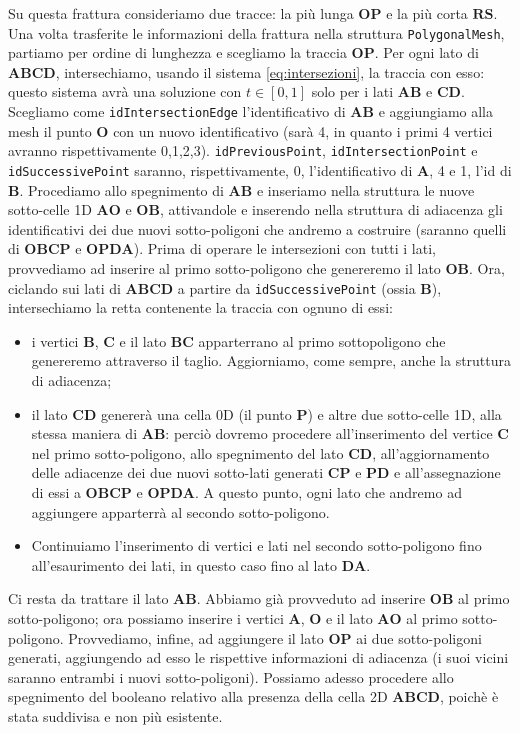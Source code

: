 \documentclass[a4paper]{article}
\newcommand{\B}{\mathbf}
\begin{document}
Su questa frattura consideriamo due tracce: la più lunga $\B{OP}$ e la più corta $\B{RS}$. Una volta trasferite le informazioni della frattura nella struttura \texttt{PolygonalMesh}, partiamo per ordine di lunghezza e scegliamo la traccia $\B{OP}$. Per ogni lato di $\B{ABCD}$, intersechiamo, usando il sistema \eqref{eq:intersezioni}, la traccia con esso: questo sistema avrà una soluzione con $t\in[0,1]$ solo per i lati $\B{AB}$ e $\B{CD}$. Scegliamo come \texttt{idIntersectionEdge} l'identificativo di $\B{AB}$ e aggiungiamo alla mesh il punto $\B O$ con un nuovo identificativo (sarà 4, in quanto i primi 4 vertici avranno rispettivamente 0,1,2,3).
 \texttt{idPreviousPoint}, \texttt{idIntersectionPoint} e \texttt{idSuccessivePoint} saranno, rispettivamente, 0, l'identificativo di $\B A$, 4 e 1, l'id di $\B B$. Procediamo allo spegnimento di $\B{AB}$ e inseriamo nella struttura le nuove sotto-celle 1D $\B{AO}$ e $\B{OB}$, attivandole e inserendo nella struttura di adiacenza gli identificativi dei due nuovi sotto-poligoni che andremo a costruire (saranno quelli di $\B{OBCP}$ e $\B{OPDA}$). Prima di operare le intersezioni con tutti i lati, provvediamo ad inserire al primo sotto-poligono che genereremo il lato $\B{OB}$. Ora, ciclando sui lati di $\B{ABCD}$ a partire da \texttt{idSuccessivePoint} (ossia $\B{B}$), intersechiamo la retta contenente la traccia con ognuno di essi: \begin{itemize} \item i vertici $\B{B}$, $\B C$ e il lato $\B{BC}$ apparterrano al primo sottopoligono che genereremo attraverso il taglio. Aggiorniamo, come sempre, anche la struttura di adiacenza; \item il lato $\B{CD}$ genererà una cella 0D (il punto $\B{P}$) e altre due sotto-celle 1D, alla stessa maniera di $\B{AB}$: perciò dovremo procedere all'inserimento del vertice $\B C$ nel primo sotto-poligono, allo spegnimento del lato $\B{CD}$, all'aggiornamento delle adiacenze dei due nuovi sotto-lati generati $\B{CP}$ e $\B{PD}$ e all'assegnazione di essi a $\B{OBCP}$ e $\B{OPDA}$. A questo punto, ogni lato che andremo ad aggiungere apparterrà al secondo sotto-poligono. \item Continuiamo l'inserimento di vertici e lati nel secondo sotto-poligono fino all'esaurimento dei lati, in questo caso fino al lato $\B{DA}$. \end{itemize} Ci resta da trattare il lato $\B{AB}$. Abbiamo già provveduto ad inserire $\B{OB}$ al primo sotto-poligono; ora possiamo inserire i vertici $\B A$, $\B O$ e il lato $\B{AO}$ al primo sotto-poligono. Provvediamo, infine, ad aggiungere il lato $\B{OP}$ ai due sotto-poligoni generati, aggiungendo ad esso le rispettive informazioni di adiacenza (i suoi vicini saranno entrambi i nuovi sotto-poligoni). Possiamo adesso procedere allo spegnimento del booleano relativo alla presenza della cella 2D $\B{ABCD}$, poichè è stata suddivisa e non più esistente.
\end{document}
